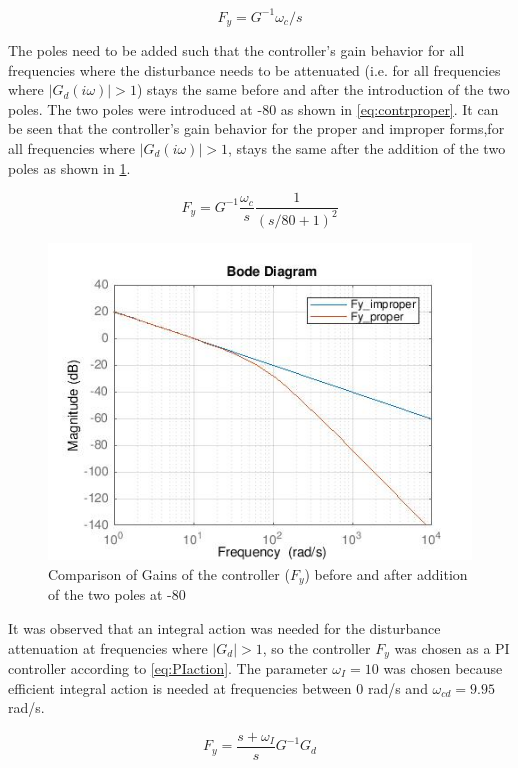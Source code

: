 \documentclass[a4paper]{article}
\begin{document}
\begin{equation}
F_y=G^{-1}\omega_c/s
\label{eq:contrimproper}
\end{equation}

The poles need to be added such that the controller's gain behavior for all frequencies where the disturbance needs to be attenuated (i.e. for all frequencies where $\lvert G_d(i\omega)\lvert>1$) stays the same before and after the introduction of the two poles. The two poles were introduced at -80 as shown in \cref{eq:contrproper}. It can be seen that the controller's gain behavior for the proper and improper forms,for all frequencies where $\lvert G_d(i\omega)\lvert>1$, stays the same after the addition of the two poles as shown in \cref{fig:gain_behavior}. 

\begin{equation}
F_y=G^{-1}\frac{\omega_c}{s}\frac{1}{(s/80+1)^2}
\label{eq:contrproper}
\end{equation}


\begin{figure}[!ht]
\centering
\includegraphics[width=.8\linewidth]{bodemag_421}
\caption{Comparison of Gains of the controller ($F_y$) before and after addition of the two poles at -80}
\label{fig:gain_behavior}
\end{figure}

It was observed that an integral action was needed for the disturbance attenuation at frequencies where $\lvert G_d\lvert>1$, so the controller $F_y$ was chosen as a PI controller according to \cref{eq:PIaction}. The parameter $\omega_I=10$ was chosen because efficient integral action is needed at frequencies between 0 rad/s and $\omega_{cd}=9.95$ rad/s.

\begin{equation}
F_y=\frac{s+\omega_I}{s}G^{-1}G_d
\label{eq:PIaction}
\end{equation}
\end{document}
